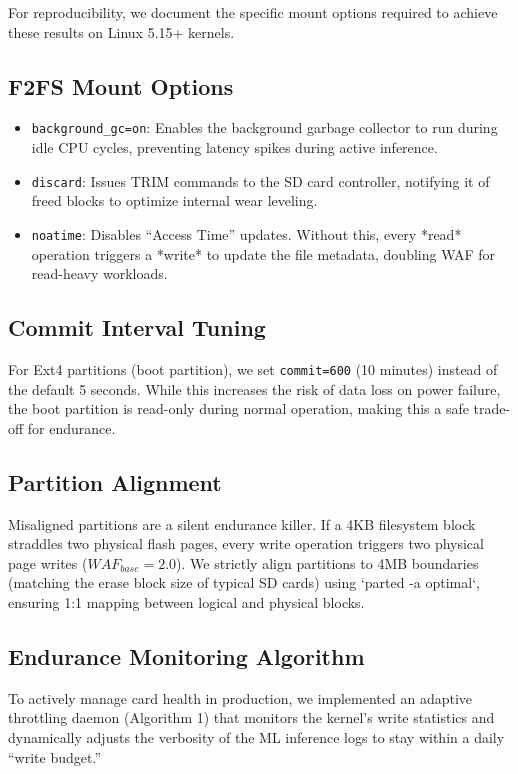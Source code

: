 \documentclass[conference]{IEEEtran}
\begin{document}
For reproducibility, we document the specific mount options required to achieve these results on Linux 5.15+ kernels.

\subsection{F2FS Mount Options}
\begin{itemize}
    \item \texttt{background\_gc=on}: Enables the background garbage collector to run during idle CPU cycles, preventing latency spikes during active inference.
    \item \texttt{discard}: Issues TRIM commands to the SD card controller, notifying it of freed blocks to optimize internal wear leveling.
    \item \texttt{noatime}: Disables ``Access Time'' updates. Without this, every *read* operation triggers a *write* to update the file metadata, doubling WAF for read-heavy workloads.
\end{itemize}

\subsection{Commit Interval Tuning}
For Ext4 partitions (boot partition), we set \texttt{commit=600} (10 minutes) instead of the default 5 seconds. While this increases the risk of data loss on power failure, the boot partition is read-only during normal operation, making this a safe trade-off for endurance.

\subsection{Partition Alignment}
Misaligned partitions are a silent endurance killer. If a 4KB filesystem block straddles two physical flash pages, every write operation triggers two physical page writes ($WAF_{base} = 2.0$). We strictly align partitions to 4MB boundaries (matching the erase block size of typical SD cards) using `parted -a optimal`, ensuring 1:1 mapping between logical and physical blocks.

\subsection{Endurance Monitoring Algorithm}
To actively manage card health in production, we implemented an adaptive throttling daemon (Algorithm 1) that monitors the kernel's write statistics and dynamically adjusts the verbosity of the ML inference logs to stay within a daily ``write budget.''
\end{document}
